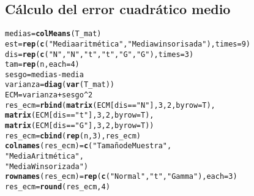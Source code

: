 \documentclass{article}\usepackage[]{graphicx}\usepackage[]{color}
\makeatletter
\newcommand{\hlnum}[1]{\textcolor[rgb]{0.686,0.059,0.569}{#1}}%
\newcommand{\hlstr}[1]{\textcolor[rgb]{0.192,0.494,0.8}{#1}}%
\newcommand{\hlopt}[1]{\textcolor[rgb]{0,0,0}{#1}}%
\newcommand{\hlstd}[1]{\textcolor[rgb]{0.345,0.345,0.345}{#1}}%
\newcommand{\hlkwb}[1]{\textcolor[rgb]{0.69,0.353,0.396}{#1}}%
\newcommand{\hlkwc}[1]{\textcolor[rgb]{0.333,0.667,0.333}{#1}}%
\newcommand{\hlkwd}[1]{\textcolor[rgb]{0.737,0.353,0.396}{\textbf{#1}}}%
\newenvironment{kframe}{%
 \def\at@end@of@kframe{}%
 \ifinner\ifhmode%
  \def\at@end@of@kframe{\end{minipage}}%
  \begin{minipage}{\columnwidth}%
 \fi\fi%
 \def\FrameCommand##1{\hskip\@totalleftmargin \hskip-\fboxsep
 \colorbox{shadecolor}{##1}\hskip-\fboxsep
     \hskip-\linewidth \hskip-\@totalleftmargin \hskip\columnwidth}%
 \MakeFramed {\advance\hsize-\width
   \@totalleftmargin\z@ \linewidth\hsize
   \@setminipage}}%
 {\par\unskip\endMakeFramed%
 \at@end@of@kframe}
\newenvironment{knitrout}{}{} %
\makeatother
\begin{document}
\subsection*{Cálculo del error cuadrático medio}
\begin{knitrout}
\color{fgcolor}\begin{kframe}
\begin{alltt}
\hlstd{medias} \hlkwb{=} \hlkwd{colMeans}\hlstd{(T_mat)}
\hlstd{est} \hlkwb{=} \hlkwd{rep}\hlstd{(}\hlkwd{c}\hlstd{(}\hlstr{"Media aritmética"}\hlstd{,} \hlstr{"Media winsorisada"}\hlstd{),}\hlkwc{times}\hlstd{=}\hlnum{9}\hlstd{)}
\hlstd{dis} \hlkwb{=} \hlkwd{rep}\hlstd{(}\hlkwd{c}\hlstd{(}\hlstr{"N"}\hlstd{,}\hlstr{"N"}\hlstd{,}\hlstr{"t"}\hlstd{,}\hlstr{"t"}\hlstd{,}\hlstr{"G"}\hlstd{,}\hlstr{"G"}\hlstd{),}\hlkwc{times}\hlstd{=}\hlnum{3}\hlstd{)}
\hlstd{tam} \hlkwb{=} \hlkwd{rep}\hlstd{(n,}\hlkwc{each}\hlstd{=}\hlnum{4}\hlstd{)}
\hlstd{sesgo} \hlkwb{=} \hlstd{medias} \hlopt{-} \hlstd{media}
\hlstd{varianza} \hlkwb{=} \hlkwd{diag}\hlstd{(}\hlkwd{var}\hlstd{(T_mat))}
\hlstd{ECM} \hlkwb{=} \hlstd{varianza} \hlopt{+} \hlstd{sesgo}\hlopt{^}\hlnum{2}
\hlstd{res_ecm} \hlkwb{=} \hlkwd{rbind}\hlstd{(}\hlkwd{matrix}\hlstd{(ECM[dis}\hlopt{==}\hlstr{"N"}\hlstd{],}\hlnum{3}\hlstd{,}\hlnum{2}\hlstd{,}\hlkwc{byrow}\hlstd{=T),}
                \hlkwd{matrix}\hlstd{(ECM[dis}\hlopt{==}\hlstr{"t"}\hlstd{],}\hlnum{3}\hlstd{,}\hlnum{2}\hlstd{,}\hlkwc{byrow}\hlstd{=T),}
                \hlkwd{matrix}\hlstd{(ECM[dis}\hlopt{==}\hlstr{"G"}\hlstd{],}\hlnum{3}\hlstd{,}\hlnum{2}\hlstd{,}\hlkwc{byrow}\hlstd{=T))}
\hlstd{res_ecm} \hlkwb{=} \hlkwd{cbind}\hlstd{(}\hlkwd{rep}\hlstd{(n,}\hlnum{3}\hlstd{),res_ecm)}
\hlkwd{colnames}\hlstd{(res_ecm)} \hlkwb{=} \hlkwd{c}\hlstd{(}\hlstr{"Tamaño de Muestra"}\hlstd{,}
                      \hlstr{"Media Aritmética"}\hlstd{,}
                      \hlstr{"Media Winsorizada"}\hlstd{)}
\hlkwd{rownames}\hlstd{(res_ecm)} \hlkwb{=} \hlkwd{rep}\hlstd{(}\hlkwd{c}\hlstd{(}\hlstr{"Normal"}\hlstd{,}\hlstr{"t"}\hlstd{,}\hlstr{"Gamma"}\hlstd{),}\hlkwc{each} \hlstd{=} \hlnum{3}\hlstd{)}
\hlstd{res_ecm} \hlkwb{=} \hlkwd{round}\hlstd{(res_ecm,}\hlnum{4}\hlstd{)}
\end{alltt}
\end{kframe}
\end{knitrout}
\end{document}
